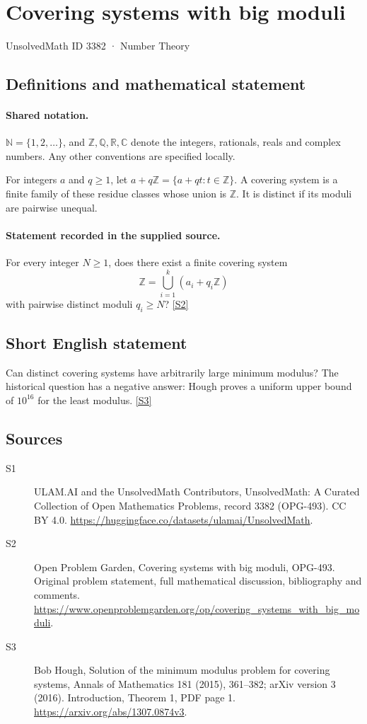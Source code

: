 \documentclass[11pt]{article}
\newcommand{\sref}[2]{\hyperlink{source:#1:#2}{[S#2]}}
\begin{document}
\setcounter{section}{3381}
\section{Covering systems with big moduli}\label{3382}
{\small\sffamily UnsolvedMath ID 3382 · Number Theory}
\subsection{Definitions and mathematical statement}

\paragraph{Shared notation.}$\mathbb N=\{1,2,\ldots\}$, and $\mathbb Z,\mathbb Q,\mathbb R,\mathbb C$ denote the integers, rationals, reals and complex numbers. Any other conventions are specified locally.


For integers $a$ and $q\ge1$, let $a+q\mathbb Z=\{a+qt:t\in\mathbb Z\}$. A covering system is a finite family of these residue classes whose union is $\mathbb Z$. It is distinct if its moduli are pairwise unequal.
\paragraph{Statement recorded in the supplied source.}
For every integer $N\ge1$, does there exist a finite covering system
\[
 \mathbb Z=\bigcup_{i=1}^k(a_i+q_i\mathbb Z)
\]
with pairwise distinct moduli $q_i\ge N$? \sref{3382}{2}
\subsection{Short English statement}
Can distinct covering systems have arbitrarily large minimum modulus? The historical question has a negative answer: Hough proves a uniform upper bound of $10^{16}$ for the least modulus. \sref{3382}{3}
\subsection{Sources}
\begin{description}
\item[\hypertarget{source:3382:1}{S1}] ULAM.AI and the UnsolvedMath Contributors, UnsolvedMath: A Curated Collection of Open Mathematics Problems, record 3382 (OPG-493). CC BY 4.0. \url{https://huggingface.co/datasets/ulamai/UnsolvedMath}.
\item[\hypertarget{source:3382:2}{S2}] Open Problem Garden, Covering systems with big moduli, OPG-493. Original problem statement, full mathematical discussion, bibliography and comments. \url{https://www.openproblemgarden.org/op/covering_systems_with_big_moduli}.
\item[\hypertarget{source:3382:3}{S3}] Bob Hough, Solution of the minimum modulus problem for covering systems, Annals of Mathematics 181 (2015), 361--382; arXiv version 3 (2016). Introduction, Theorem 1, PDF page 1. \url{https://arxiv.org/abs/1307.0874v3}.
\end{description}
\label{end:3382}
\end{document}

